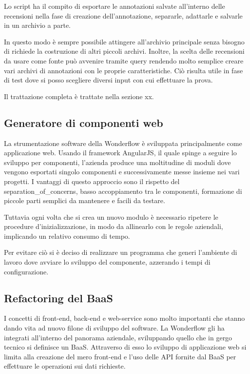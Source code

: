 Lo \gls{script} ha il compito di esportare le annotazioni salvate all'interno
delle recensioni nella fase di creazione dell'annotazione, separarle, adattarle
e salvarle in un archivio a parte.

In questo modo è sempre possibile attingere all'archivio principale senza
bisogno di richiede la costruzione di altri piccoli archivi. Inoltre, la scelta
delle recensioni da usare come fonte può avvenire tramite query rendendo molto
semplice creare vari archivi di annotazioni con le proprie caratteristiche. Ciò
risulta utile in fase di test dove si posso scegliere diversi input con cui
effettuare la prova.

Il trattazione completa è trattate nella sezione xx.

\subsection{Generatore di componenti web}
La strumentazione software della Wonderflow è sviluppata principalmente come
applicazione web. Usando il framework AngularJS, il quale spinge a seguire lo
sviluppo per componenti, l'azienda produce una moltitudine di moduli dove
vengono esportati singolo componenti e successivamente messe insieme nei vari
progetti. I vantaggi di questo approccio sono il rispetto del
\gls{separation_of_concerns}, basso accoppiamento tra le componenti,
formazione di piccole parti semplici da mantenere e facili da testare.

Tuttavia ogni volta che si crea un nuovo modulo è necessario ripetere le
procedure d'inizializzazione, in modo da allinearlo con le regole aziendali,
implicando un relativo consumo di tempo.

Per evitare ciò si è deciso di realizzare un programma che generi l'ambiente di
lavoro dove avviare lo sviluppo del componente, azzerando i tempi di
configurazione.

\subsection{Refactoring del BaaS}
I concetti di \gls{front-end}, \gls{back-end} e \gls{web-service} sono molto
importanti che stanno dando vita ad nuovo filone di sviluppo del software.
La Wonderflow gli ha integrati all'interno del panorama aziendale, sviluppando
quello che in gergo tecnico si definisce un \gls{BaaS}. Attraverso
di esso lo sviluppo di applicazione web si limita alla creazione del mero
\gls{front-end} e l'uso delle \gls{API} fornite dal \gls{BaaS} per effettuare
le operazioni sui dati richieste.

